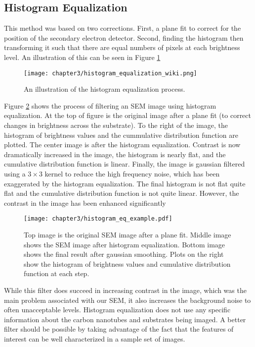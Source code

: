 \subsection{Histogram Equalization}

This method was based on two corrections. First, a plane fit to correct for the position of the secondary electron detector. Second, finding the histogram then transforming it such that there are equal numbers of pixels at each brightness level. An illustration of this can be seen in Figure \ref{fig:hist_eq}

\begin{figure}
	\centering
	\texttt{[image: chapter3/histogram\_equalization\_wiki.png]}
	\caption{An illustration of the histogram equalization process.}
	\label{fig:hist_eq}
\end{figure}

Figure \ref{fig:hist_eq_data} shows the process of filtering an SEM image using histogram equalization. At the top of figure is the original image after a plane fit (to correct changes in brightness across the substrate). To the right of the image, the histogram of brightness values and the cummulative distribution function are plotted. The center image is after the histogram equalization. Contrast is now dramatically increased in the image, the histogram is nearly flat, and the cumulative distribution function is linear. Finally, the image is gaussian filtered using a $3 \times 3$ kernel to reduce the high frequency noise, which has been exaggerated by the histogram equalization. The final histogram is not flat quite flat and the cumulative distribution function is not quite linear. However, the contrast in the image has been enhanced significantly

\begin{figure}
	\centering
	\texttt{[image: chapter3/histogram\_eq\_example.pdf]}
	\caption{Top image is the original SEM image after a plane fit. Middle image shows the SEM image after histogram equalization. Bottom image shows the final result after gaussian smoothing. Plots on the right show the histogram of brightness values and cumulative distribution function at each step.}
	\label{fig:hist_eq_data}
\end{figure}

While this filter does succeed in increasing contrast in the image, which was the main problem associated with our SEM, it also increases the background noise to often unacceptable levels. Histogram equalization does not use any specific information about the carbon nanotubes and substrates being imaged. A better filter should be possible by taking advantage of the fact that the features of interest can be well characterized in a sample set of images. 

